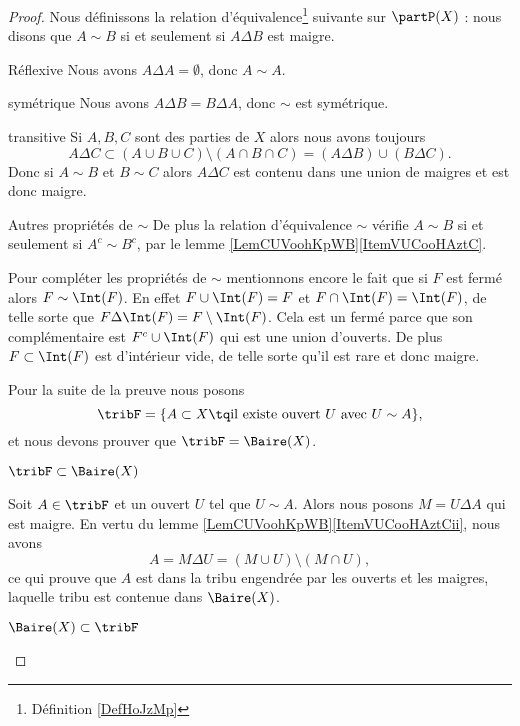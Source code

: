 \begin{proof}
    Nous définissons la relation d'équivalence\footnote{Définition \ref{DefHoJzMp}} suivante sur \( \partP(X)\) : nous disons que \( A\sim B\) si et seulement si \( A\Delta B\) est maigre.
    \begin{subproof}
    \item[Réflexive]
        Nous avons \( A\Delta A=\emptyset\), donc \( A\sim A\).
    \item[symétrique] Nous avons \( A\Delta B=B\Delta A\), donc \( \sim\) est symétrique.
    \item[transitive] Si \( A,B,C\) sont des parties de \( X\) alors nous avons toujours
        \begin{equation}
            A\Delta C\subset (A\cup B\cup C)\setminus(A\cap B\cap C)=(A\Delta B)\cup (B\Delta C).
        \end{equation}
        Donc si \( A\sim B\) et \( B\sim C\) alors \( A\Delta C\) est contenu dans une union de maigres et est donc maigre.
    \item[Autres propriétés de \( \sim\)]
        De plus la relation d'équivalence \( \sim\) vérifie \( A\sim B\) si et seulement si \( A^c\sim B^c\), par le lemme \ref{LemCUVoohKpWB}\ref{ItemVUCooHAztC}.

        Pour compléter les propriétés de \( \sim\) mentionnons encore le fait que si \( F\) est fermé alors \( F\sim\Int(F)\). En effet \( F\cup\Int(F)=F\) et \( F\cap\Int(F)=\Int(F)\), de telle sorte que \( F\Delta\Int(F)=F\setminus\Int(F)\). Cela est un fermé parce que son complémentaire est \( F^c\cup\Int(F)\) qui est une union d'ouverts. De plus \( F\subset\Int(F)\) est d'intérieur vide, de telle sorte qu'il est rare et donc maigre.
    \end{subproof}

    Pour la suite de la preuve nous posons
    \begin{equation}
        \tribF=\{ A\subset X\tq\text{il existe ouvert \( U\) avec \( U\sim A\)} \},
    \end{equation}
    et nous devons prouver que \( \tribF=\Baire(X)\).

    \begin{subproof}
        \item[\( \tribF\subset\Baire(X)\)]
        
            Soit \( A\in\tribF\) et un ouvert \( U\) tel que \( U\sim A\). Alors nous posons \( M=U\Delta A\) qui est maigre. En vertu du lemme \ref{LemCUVoohKpWB}\ref{ItemVUCooHAztCii}, nous avons 
            \begin{equation}
                A=M\Delta U=(M\cup U)\setminus(M\cap U),
            \end{equation}
            ce qui prouve que \( A\) est dans la tribu engendrée par les ouverts et les maigres, laquelle tribu est contenue dans \( \Baire(X)\).
        \item[\( \Baire(X)\subset\tribF\)]


\end{subproof}
\end{proof}
